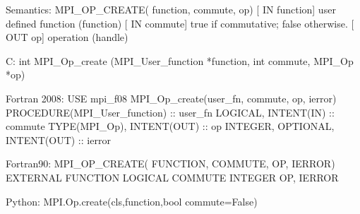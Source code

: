 Semantics:
MPI_OP_CREATE( function, commute, op)
[ IN function] user defined function (function)
[ IN commute] true if commutative; false otherwise.
[ OUT op] operation (handle)

C:
int MPI_Op_create
   (MPI_User_function *function, int commute,
    MPI_Op *op)

Fortran 2008:
USE mpi_f08
MPI_Op_create(user_fn, commute, op, ierror)
PROCEDURE(MPI_User_function) :: user_fn
LOGICAL, INTENT(IN) :: commute
TYPE(MPI_Op), INTENT(OUT) :: op
INTEGER, OPTIONAL, INTENT(OUT) :: ierror

Fortran90:
MPI_OP_CREATE( FUNCTION, COMMUTE, OP, IERROR)
EXTERNAL FUNCTION
LOGICAL COMMUTE
INTEGER OP, IERROR

Python:
MPI.Op.create(cls,function,bool commute=False)

